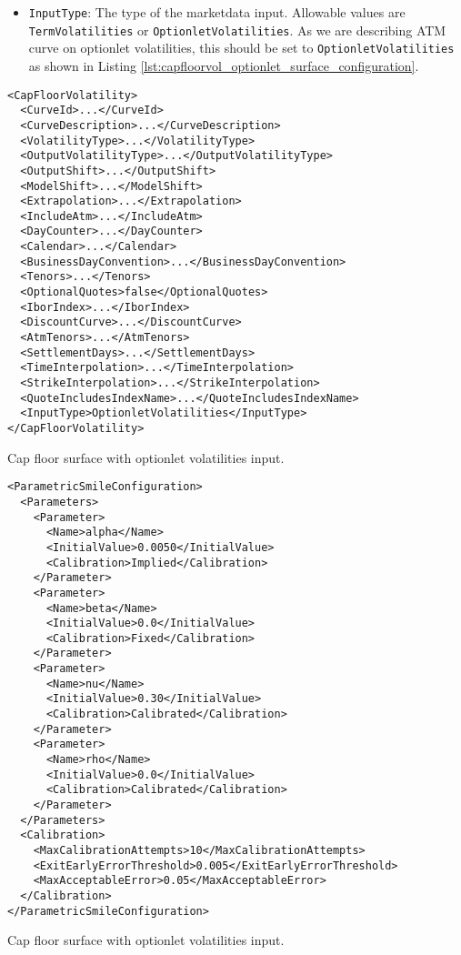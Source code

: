 \begin{itemize}
\item \lstinline!InputType!:
The type of the marketdata input. Allowable values are \lstinline!TermVolatilities! or \lstinline!OptionletVolatilities!. As we are describing ATM curve on optionlet volatilities, this should be set to \lstinline!OptionletVolatilities! as shown in Listing \ref{lst:capfloorvol_optionlet_surface_configuration}.

\end{itemize}

\begin{longlisting}
\begin{verbatim}
<CapFloorVolatility>
  <CurveId>...</CurveId>
  <CurveDescription>...</CurveDescription>
  <VolatilityType>...</VolatilityType>
  <OutputVolatilityType>...</OutputVolatilityType>
  <OutputShift>...</OutputShift>
  <ModelShift>...</ModelShift>
  <Extrapolation>...</Extrapolation>
  <IncludeAtm>...</IncludeAtm>
  <DayCounter>...</DayCounter>
  <Calendar>...</Calendar>
  <BusinessDayConvention>...</BusinessDayConvention>
  <Tenors>...</Tenors>
  <OptionalQuotes>false</OptionalQuotes>
  <IborIndex>...</IborIndex>
  <DiscountCurve>...</DiscountCurve>
  <AtmTenors>...</AtmTenors>
  <SettlementDays>...</SettlementDays>
  <TimeInterpolation>...</TimeInterpolation>
  <StrikeInterpolation>...</StrikeInterpolation>
  <QuoteIncludesIndexName>...</QuoteIncludesIndexName>
  <InputType>OptionletVolatilities</InputType>
</CapFloorVolatility>
\end{verbatim}
\caption{Cap floor surface with optionlet volatilities input.}
\label{lst:capfloorvol_optionlet_surface_configuration}
\end{longlisting}

\begin{longlisting}
\begin{verbatim}
<ParametricSmileConfiguration>
  <Parameters>
    <Parameter>
      <Name>alpha</Name>
      <InitialValue>0.0050</InitialValue>
      <Calibration>Implied</Calibration>
    </Parameter>
    <Parameter>
      <Name>beta</Name>
      <InitialValue>0.0</InitialValue>
      <Calibration>Fixed</Calibration>
    </Parameter>
    <Parameter>
      <Name>nu</Name>
      <InitialValue>0.30</InitialValue>
      <Calibration>Calibrated</Calibration>
    </Parameter>
    <Parameter>
      <Name>rho</Name>
      <InitialValue>0.0</InitialValue>
      <Calibration>Calibrated</Calibration>
    </Parameter>
  </Parameters>
  <Calibration>
    <MaxCalibrationAttempts>10</MaxCalibrationAttempts>
    <ExitEarlyErrorThreshold>0.005</ExitEarlyErrorThreshold>
    <MaxAcceptableError>0.05</MaxAcceptableError>
  </Calibration>
</ParametricSmileConfiguration>
\end{verbatim}
\caption{Cap floor surface with optionlet volatilities input.}
\label{lst:capfloorvol_parametric_smile_config}
\end{longlisting}

